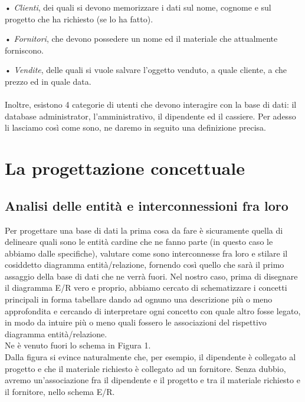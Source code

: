 \documentclass[a4paper,12pt,italian]{article}
\begin{document}
• \emph{Clienti}, dei quali si devono memorizzare i dati sul nome, cognome e sul progetto che ha richiesto (se lo ha fatto).

• \emph{Fornitori}, che devono possedere un nome ed il materiale che attualmente forniscono.

• \emph{Vendite}, delle quali si vuole salvare l'oggetto venduto, a quale cliente, a che prezzo ed in quale data. \\ \\
Inoltre, esistono 4 categorie di utenti che devono interagire con la base di dati: il database administrator, l'amministrativo, il dipendente ed il cassiere. Per adesso li lasciamo così come sono, ne daremo in seguito una definizione precisa.

\section{La progettazione concettuale}
\subsection{Analisi delle entità e interconnessioni fra loro}
Per progettare una base di dati la prima cosa da fare è sicuramente quella di delineare quali sono le entità cardine che ne fanno parte (in questo caso le abbiamo dalle specifiche), valutare come sono interconnesse fra loro e stilare il cosiddetto diagramma entità/relazione, fornendo così quello che sarà il primo assaggio della base di dati che ne verrà fuori.
Nel nostro caso, prima di disegnare il diagramma E/R vero e proprio, abbiamo cercato di schematizzare i concetti principali in forma tabellare dando ad ognuno una descrizione più o meno approfondita e cercando di interpretare ogni concetto con quale altro fosse legato, in modo da intuire più o meno quali fossero le associazioni del rispettivo diagramma entità/relazione. \\
Ne è venuto fuori lo schema in Figura 1. \\
Dalla figura si evince naturalmente che, per esempio, il dipendente è collegato al progetto e che il materiale richiesto è collegato ad un fornitore. Senza dubbio, avremo un'associazione fra il dipendente e il progetto e tra il materiale richiesto e il fornitore, nello schema E/R. \\
\end{document}
